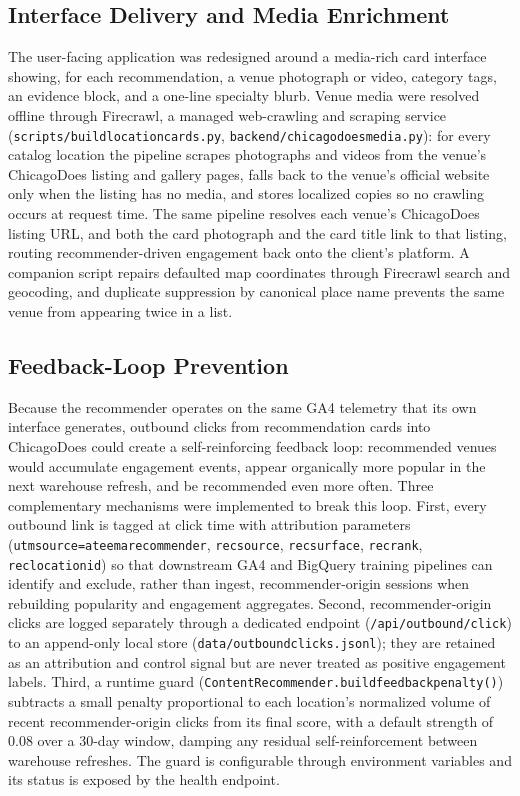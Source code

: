 \documentclass[12pt,letterpaper]{article}
\newcommand{\codeunderscore}{\discretionary{\textunderscore}{}{\textunderscore}}
\newcommand{\code}[1]{\begingroup\let\_\codeunderscore\texttt{\small #1}\endgroup}
\begin{document}
\subsection{Interface Delivery and Media Enrichment}\label{sec:media}

The user-facing application was redesigned around a media-rich card
interface showing, for each recommendation, a venue photograph or
video, category tags, an evidence block, and a one-line specialty
blurb. Venue media were resolved offline through Firecrawl, a
managed web-crawling and scraping service
(\code{scripts/build\_location\_cards.py},
\code{backend/chicagodoes\_media.py}): for every catalog location
the pipeline scrapes photographs and videos from the venue's
ChicagoDoes listing and gallery pages, falls back to the venue's
official website only when the listing has no media, and stores
localized copies so no crawling occurs at request time. The same
pipeline resolves each venue's ChicagoDoes listing URL, and both the
card photograph and the card title link to that listing, routing
recommender-driven engagement back onto the client's platform. A
companion script repairs defaulted map coordinates through Firecrawl
search and geocoding, and duplicate suppression by canonical place
name prevents the same venue from appearing twice in a list.

\subsection{Feedback-Loop Prevention}\label{sec:guard}

Because the recommender operates on the same GA4 telemetry that its
own interface generates, outbound clicks from recommendation cards
into ChicagoDoes could create a self-reinforcing feedback loop:
recommended venues would accumulate engagement events, appear
organically more popular in the next warehouse refresh, and be
recommended even more often. Three complementary mechanisms were
implemented to break this loop. First, every outbound link is tagged
at click time with attribution parameters
(\code{utm\_source=ateema\_recommender}, \code{rec\_source},
\code{rec\_surface}, \code{rec\_rank}, \code{rec\_location\_id}) so
that downstream GA4 and BigQuery training pipelines can identify and
exclude, rather than ingest, recommender-origin sessions when
rebuilding popularity and engagement aggregates. Second,
recommender-origin clicks are logged separately through a dedicated
endpoint (\code{/api/outbound/click}) to an append-only local store
(\code{data/outbound\_clicks.jsonl}); they are retained as an
attribution and control signal but are never treated as positive
engagement labels. Third, a runtime guard
(\code{ContentRecommender.\_build\_feedback\_penalty()}) subtracts a
small penalty proportional to each location's normalized volume of
recent recommender-origin clicks from its final score, with a default
strength of $0.08$ over a 30-day window, damping any residual
self-reinforcement between warehouse refreshes. The guard is
configurable through environment variables and its status is exposed
by the health endpoint.
\end{document}
